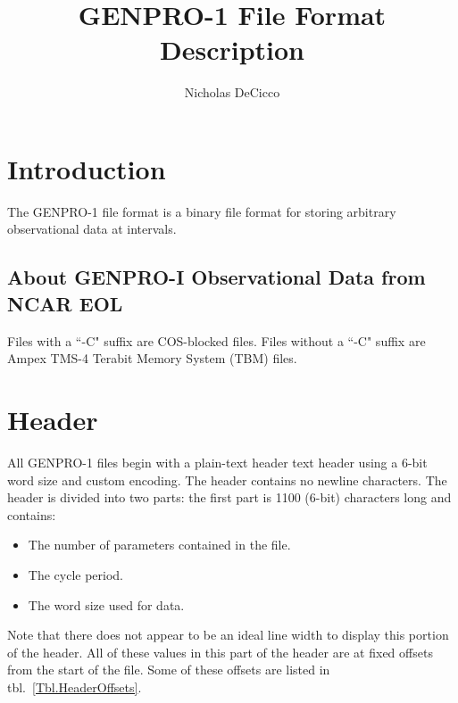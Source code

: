 \documentclass{report}
\begin{document}
\title{GENPRO-1 File Format Description}
\author{Nicholas DeCicco}

\maketitle

\section{Introduction}

The GENPRO-1 file format is a binary file format for storing arbitrary observational data at intervals.

\subsection{About GENPRO-I Observational Data from NCAR EOL}

Files with a ``-C" suffix are COS-blocked files. Files without a ``-C" suffix are Ampex TMS-4 Terabit Memory System (TBM) files. %

\section{Header}

All GENPRO-1 files begin with a plain-text header text header using a 6-bit word size and custom encoding. The header contains no newline characters. The header is divided into two parts: the first part is 1100 (6-bit) characters long and contains:
\begin{itemize}[noitemsep]
	\item The number of parameters contained in the file.
	\item The cycle period.
	\item The word size used for data.
\end{itemize}

Note that there does not appear to be an ideal line width to display this portion of the header. All of these values in this part of the header are at fixed offsets from the start of the file. Some of these offsets are listed in tbl.~\ref{Tbl.HeaderOffsets}.
\end{document}
